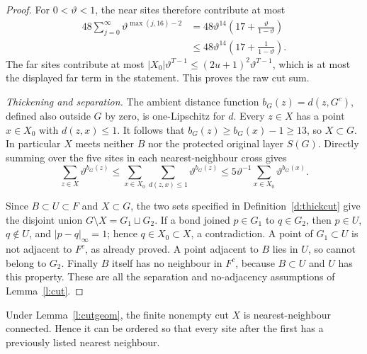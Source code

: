 \begin{proof}
For \(0<\vartheta<1\), the near sites therefore contribute at most
\[
 \begin{split}
 48\sum_{j=0}^{\infty}\vartheta^{\max(j,16)-2}
 &=48\vartheta^{14}
                    \left(17+\frac{\vartheta}{1-\vartheta}\right)\\
 &\le48\vartheta^{14}
                    \left(17+\frac1{1-\vartheta}\right).
 \end{split}
\]
The far sites contribute at most
\(|X_0|\vartheta^{T-1}\le(2u+1)^2\vartheta^{T-1}\),
which is at most the displayed far term in the statement.
This proves the raw cut sum.

\emph{Thickening and separation.}
The ambient distance function \(b_G(z)=d(z,G^c)\), defined
also outside \(G\) by zero, is one-Lipschitz for \(d\).
Every \(z\in X\) has a point \(x\in X_0\) with \(d(z,x)\le1\).
It follows that \(b_G(z)\ge b_G(x)-1\ge13\), so \(X\subset G\).
In particular \(X\) meets neither \(B\) nor the protected
original layer \(S(G)\).  Directly summing over the five sites
in each nearest-neighbour cross
gives
\[
 \sum_{z\in X}\vartheta^{b_G(z)}
    \le\sum_{x\in X_0}\sum_{d(z,x)\le1}
                              \vartheta^{b_G(z)}
    \le5\vartheta^{-1}\sum_{x\in X_0}\vartheta^{b_G(x)}.
\]

Since \(B\subset U\subset F\) and \(X\subset G\), the two
sets specified in Definition~\ref{d:thickcut} give the disjoint
union \(G\setminus X=G_1\sqcup G_2\).  If a bond joined
\(p\in G_1\) to \(q\in G_2\), then \(p\in U\), \(q\notin U\),
and \(|p-q|_\infty=1\); hence \(q\in X_0\subset X\), a
contradiction.  A point of \(G_1\subset U\) is not adjacent to
\(F^c\), as already proved.  A point adjacent to \(B\) lies
in \(U\), so cannot belong to \(G_2\).  Finally \(B\) itself
has no neighbour in \(F^c\), because \(B\subset U\) and
\(U\) has this property.  These are all the separation and
no-adjacency assumptions of Lemma~\ref{l:cut}.
\end{proof}

\begin{lemma}\label{l:Xconn}
Under Lemma~\ref{l:cutgeom}, the finite nonempty cut \(X\) is
nearest-neighbour connected. Hence it can be ordered so that every
site after the first has a previously listed nearest neighbour.
\end{lemma}

